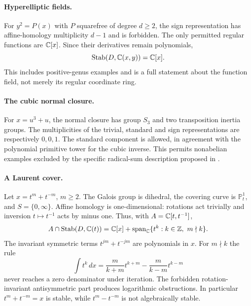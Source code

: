 \paragraph{Hyperelliptic fields.}
For $y^2=P(x)$ with $P$ squarefree of degree $d\ge2$, the sign representation
has affine-homology multiplicity $d-1$ and is forbidden. The only permitted
regular functions are $\mathbb C[x]$. Since their derivatives remain polynomials,
\[
 \operatorname{Stab}(D,\mathbb C(x,y))=\mathbb C[x].
\]
This includes positive-genus examples and is a full statement about the
function field, not merely its regular coordinate ring.

\paragraph{The cubic normal closure.}
For $x=u^3+u$, the normal closure has group $S_3$ and two transposition inertia
groups. The multiplicities of the trivial, standard and sign representations
are respectively $0,0,1$. The standard component is allowed, in agreement
with the polynomial primitive tower for the cubic inverse. This permits
nonabelian examples excluded by the specific radical-sum description proposed
in \cite{Chen2022}.

\paragraph{A Laurent cover.}
Let $x=t^m+t^{-m}$, $m\ge2$. The Galois group is dihedral, the covering curve
is $\mathbb P^1_t$, and $S=\{0,\infty\}$. Affine homology is one-dimensional:
rotations act trivially and inversion $t\mapsto t^{-1}$ acts by minus one.
Thus, with $A=\mathbb C[t,t^{-1}]$,
\[
 A\cap\operatorname{Stab}(D,\mathbb C(t))
   =\mathbb C[x]+\operatorname{span}_{\mathbb C}\{t^k:k\in\mathbb Z,\ m\nmid k\}.
\]
The invariant symmetric terms $t^{jm}+t^{-jm}$ are polynomials in $x$.
For $m\nmid k$ the rule
\[
 \int t^k\,dx=
  \frac{m}{k+m}t^{k+m}-\frac{m}{k-m}t^{k-m}
\]
never reaches a zero denominator under iteration. The forbidden rotation-
invariant antisymmetric part produces logarithmic obstructions. In particular
$t^m+t^{-m}=x$ is stable, while $t^m-t^{-m}$ is not algebraically stable.

